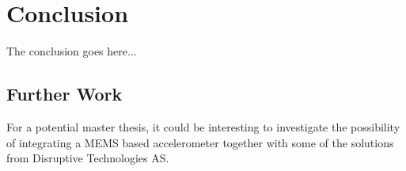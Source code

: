 \chapter{Conclusion}

The conclusion goes here...

\section{Further Work}

For a potential master thesis, it could be interesting to investigate the possibility of integrating a MEMS based accelerometer together with some of the solutions from Disruptive Technologies AS. 